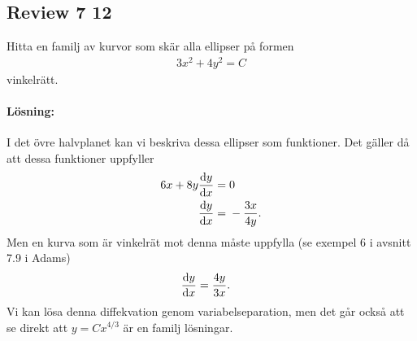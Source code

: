 \subsection{Review 7 12}%
\label{sub:review_7_12}

Hitta en familj av kurvor som skär alla ellipser på formen
\begin{align*}
	3 x^2 + 4 y^2 = C
\end{align*}
vinkelrätt.

\paragraph{Lösning:}

I det övre halvplanet kan vi beskriva dessa ellipser som funktioner.
Det gäller då att dessa funktioner uppfyller
\begin{align*}
	6 x + 8 y \derivative{y}{x} ={}& 0\\
	\derivative{y}{x} ={}& -\frac{3 x}{4 y}.
\end{align*}
Men en kurva som är vinkelrät mot denna måste uppfylla (se exempel 6 i avsnitt 7.9 i Adams)
\begin{align*}
	\derivative{y}{x} ={}& \frac{4 y}{3 x}.
\end{align*}
Vi kan lösa denna diffekvation genom variabelseparation, men det går också att se direkt att $y = C x^{4 / 3}$ är en familj lösningar.



